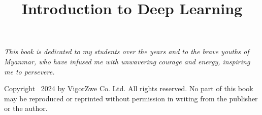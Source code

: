 \documentclass[12pt,a4paper,violet]{bbe}
\title{Introduction to Deep Learning}
\begin{document}

\thispagestyle{empty}


\newpage
\thispagestyle{empty}
\vspace*{9cm}
\begin{center}
   \emph{\color{darkgray}This book is dedicated to my students over the years and to the brave youths of Myanmar, who have infused me with unwavering courage and energy, inspiring me to persevere.}
\end{center}


\newpage 
\thispagestyle{empty}
\vspace*{\fill}
\small
Copyright \textcopyright\ 2024 by VigorZwe Co. Ltd. All rights reserved.
No part of this book may be reproduced or reprinted without permission in writing from the publisher or the author.
\clearpage 
{}
\setcounter{page}{1} %
\end{document}
